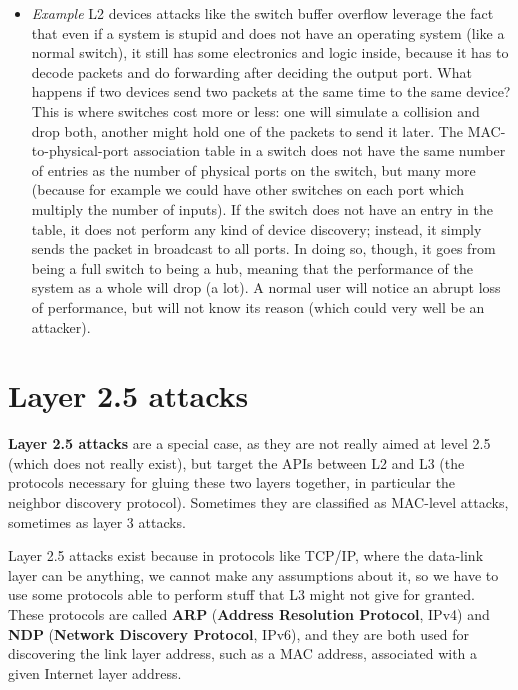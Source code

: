 \begin{itemize}
\begin{itemize}
		\item[] \emph{Example} L2 devices attacks like the switch buffer overflow leverage the fact that even if a system is stupid and does not have an operating system (like a normal switch), it still has some electronics and logic inside, because it has to decode packets and do forwarding after deciding the output port. What happens if two devices send two packets at the same time to the same device? This is where switches cost more or less: one will simulate a collision and drop both, another might hold one of the packets to send it later. The MAC-to-physical-port association table in a switch does not have the same number of entries as the number of physical ports on the switch, but many more (because for example we could have other switches on each port which multiply the number of inputs). If the switch does not have an entry in the table, it does not perform any kind of device discovery; instead, it simply sends the packet in broadcast to all ports. In doing so, though, it goes from being a full switch to being a hub, meaning that the performance of the system as a whole will drop (a lot). A normal user will notice an abrupt loss of performance, but will not know its reason (which could very well be an attacker).
	\end{itemize}
\end{itemize}
 

\section{Layer 2.5 attacks}
\textbf{Layer 2.5 attacks} are a special case, as they are not really aimed at level 2.5 (which does not really exist), but target the APIs between L2 and L3 (the protocols necessary for gluing these two layers together, in particular the neighbor discovery protocol). Sometimes they are classified as MAC-level attacks, sometimes as layer 3 attacks.

Layer 2.5 attacks exist because in protocols like TCP/IP, where the data-link layer can be anything, we cannot make any assumptions about it, so we have to use some protocols able to perform stuff that L3 might not give for granted. These protocols are called \textbf{ARP} (\textbf{Address Resolution Protocol}, IPv4) and \textbf{NDP} (\textbf{Network Discovery Protocol}, IPv6), and they are both used for discovering the link layer address, such as a MAC address, associated with a given Internet layer address.

